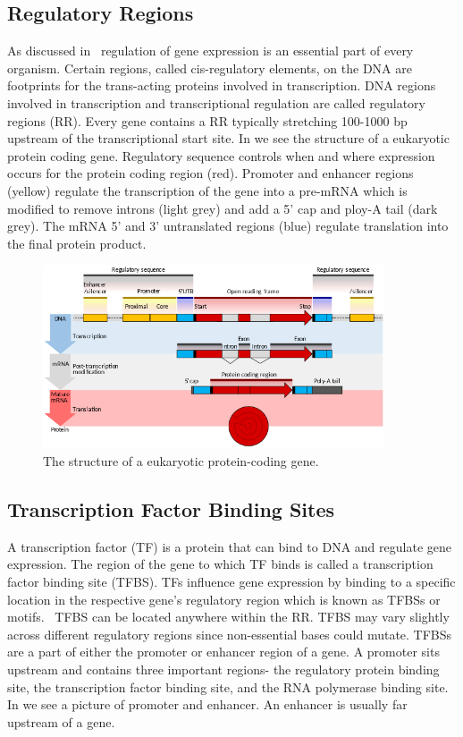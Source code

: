 \subsection{Regulatory Regions}
As discussed in~\cite{Riethoven2010} regulation of gene expression
is an essential part of every organism. Certain regions,
called cis-regulatory elements, on the DNA are footprints for
the trans-acting proteins involved in transcription. DNA
regions involved in transcription and transcriptional regulation
are called regulatory regions (RR).
Every gene contains a RR typically
stretching 100-1000 bp upstream of the transcriptional start site.
In   we see the structure of a eukaryotic protein
coding gene. Regulatory sequence controls when and where expression
occurs for the protein coding region (red). Promoter and enhancer
regions (yellow) regulate the transcription of the gene into a
pre-mRNA which is modified to remove introns (light grey) and
add a 5' cap and ploy-A tail (dark grey). The mRNA 5' and 3'
untranslated regions (blue) regulate translation into the
final protein product.


\begin{figure}[!tb]
	\centering
	\includegraphics[width=0.9\textwidth]{figures/rr}
	\caption{The structure of a eukaryotic protein-coding gene.}
	\label{fig:rr}
\end{figure}


\subsection{Transcription Factor Binding Sites}
A transcription factor (TF) is a protein that can bind to DNA
and regulate gene expression. The region of the gene to which
TF binds is called a transcription factor binding site (TFBS).
TFs influence gene expression by binding to a specific location
in the respective gene’s regulatory region which is known as
TFBSs or motifs.~\cite{wei2007comparative} TFBS can be located
anywhere within the RR. TFBS may vary slightly across different
regulatory regions since non-essential bases could mutate.
TFBSs are a part of either the promoter or enhancer region of a gene.
A promoter sits upstream and contains three important regions-
the regulatory protein binding site, the transcription factor
binding site, and the RNA polymerase binding site.
In  we see a picture of promoter
and enhancer. An enhancer is usually far upstream of a gene.

